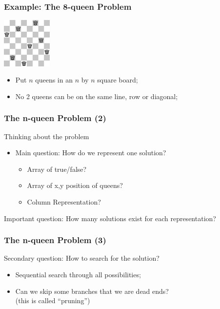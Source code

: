 \documentclass{beamer}
\begin{document}
\begin{frame}
  \frametitle{Example: The 8-queen Problem}
  \includegraphics[width=2.5cm]{img/eightqueen}
  \begin{block}{}
    \begin{itemize}
    \item Put $n$ queens in an $n$ by $n$ square board;
    \item No 2 queens can be on the same line, row or diagonal;
    \end{itemize}
  \end{block}
\end{frame}


\begin{frame}
  \frametitle{The n-queen Problem (2)}
  \begin{block}{Thinking about the problem}
    \begin{itemize}
    \item Main question: How do we represent one solution?
      \begin{itemize}
      \item Array of true/false?
      \item Array of x,y position of queens?
      \item Column Representation?
      \end{itemize}
    \end{itemize}
  \end{block}
  \begin{block}{}
    Important question: How many solutions exist for each
    representation?
  \end{block}
\end{frame}

\begin{frame}
  \frametitle{The n-queen Problem (3)}
  \begin{block}{Secondary question: How to search for the solution?}
    \begin{itemize}
    \item Sequential search through all possibilities;
    \item Can we skip some branches that we  are dead ends?\\
      {\small(this is called ``pruning'')}
    \end{itemize}
  \end{block}
\end{frame}
\end{document}
